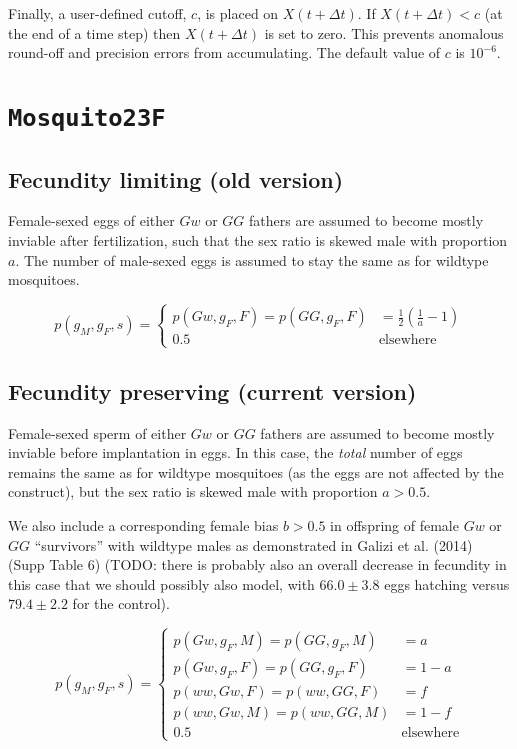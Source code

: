 \documentclass[11pt,a4paper]{article}
\begin{document}
Finally, a user-defined cutoff, $c$, is placed on $X(t + \Delta t)$.  If $X(t + \Delta t) < c$ (at the end of a time step) then $X(t + \Delta t)$ is set to zero.  This prevents anomalous round-off and precision errors from accumulating.  The default value of $c$ is $10^{-6}$.

\section{\tt Mosquito23F}
\subsection{Fecundity limiting (old version)}
Female-sexed eggs of either $Gw$ or $GG$ fathers are assumed to become mostly inviable after fertilization, such that the sex ratio is skewed male with proportion $a$. The number of male-sexed eggs is assumed to stay the same as for wildtype mosquitoes.

\begin{equation}
 p(g_M, g_F, s) = \begin{cases}
		p(Gw, g_F, F) = p(GG, g_F, F) & = \frac{1}{2}\left(\frac{1}{a} - 1\right) \\
		0.5 & \textrm{elsewhere}
		\end{cases}
\end{equation}

\subsection{Fecundity preserving (current version)}
Female-sexed sperm of either $Gw$ or $GG$ fathers are assumed to become mostly inviable before implantation in eggs. In this case, the \emph{total} number of eggs remains the same as for wildtype mosquitoes (as the eggs are not affected by the construct), but the sex ratio is skewed male with proportion $a > 0.5$.

We also include a corresponding female bias $b > 0.5$ in offspring of female $Gw$ or $GG$ ``survivors'' with wildtype males as demonstrated in Galizi et al. (2014) (Supp Table 6) (TODO: there is probably also an overall decrease in fecundity in this case that we should possibly also model, with $66.0 \pm 3.8$ eggs hatching versus $79.4 \pm 2.2$ for the control).

\begin{equation}
 p(g_M, g_F, s) = \begin{cases}
		p(Gw, g_F, M) = p(GG, g_F, M) & = a \\
		p(Gw, g_F, F) = p(GG, g_F, F) & = 1 - a \\
		p(ww, Gw, F) = p(ww, GG, F) & = f \\
		p(ww, Gw, M) = p(ww, GG, M) & = 1 - f \\
		0.5 &\textrm{elsewhere}
		\end{cases}
\end{equation}
\end{document}
